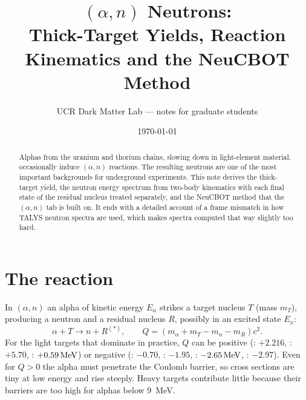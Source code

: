 
\title{$(\alpha,n)$ Neutrons:\\ Thick-Target Yields, Reaction Kinematics and the NeuCBOT Method}
\author{UCR Dark Matter Lab --- notes for graduate students}
\date{\today}

\maketitle
\seriesnote

\begin{abstract}
Alphas from the uranium and thorium chains, slowing down in light-element material, occasionally induce $(\alpha,n)$ reactions. The resulting neutrons are one of the most important backgrounds for underground experiments. This note derives the thick-target yield, the neutron energy spectrum from two-body kinematics with each final state of the residual nucleus treated separately, and the NeuCBOT method that the $(\alpha,n)$ tab is built on. It ends with a detailed account of a frame mismatch in how TALYS neutron spectra are used, which makes spectra computed that way slightly too hard.
\end{abstract}
\tableofcontents

\section{The reaction}
In $(\alpha,n)$ an alpha of kinetic energy $E_\alpha$ strikes a target nucleus $T$ (mass $m_T$), producing a neutron and a residual nucleus $R$, possibly in an excited state $E_x$:
\begin{equation}
\alpha + T \to n + R^{(*)}, \qquad Q = (m_\alpha + m_T - m_n - m_R)c^2 .
\end{equation}
For the light targets that dominate in practice, $Q$ can be positive (: $+2.216$, : $+5.70$, : $+0.59\,\mathrm{MeV}$) or negative (: $-0.70$, : $-1.95$, : $-2.65\,\mathrm{MeV}$, : $-2.97$). Even for $Q>0$ the alpha must penetrate the Coulomb barrier, so cross sections are tiny at low energy and rise steeply. Heavy targets contribute little because their barriers are too high for alphas below \SI{9}{MeV}.

